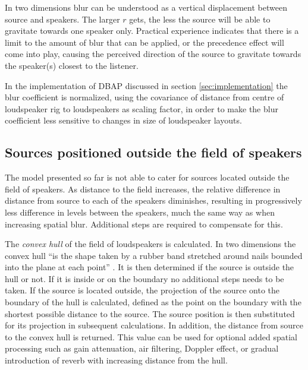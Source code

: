 \documentclass[twoside,10pt]{article}
\begin{document}
In two dimensions blur can be understood as a vertical displacement between source and speakers. The larger $r$ gets, the less the source will be able to gravitate towards one speaker only. Practical experience indicates that there is a limit to the amount of blur that can be applied, or the precedence effect \cite{Litovsky:1999precedence_effect} will come into play, causing the perceived direction of the source to gravitate towards the speaker(s) closest to the listener.

In the implementation of DBAP discussed in section \ref{sec:implementation} the blur coefficient is normalized, using the covariance of distance from centre of loudspeaker rig to loudspeakers as scaling factor, in order to make the blur coefficient less sensitive to changes in size of loudspeaker layouts.



\subsection{Sources positioned outside the field of speakers}

The model presented so far is not able to cater for sources located outside the field of speakers. As distance to the field increases, the relative difference in distance from source to each of the speakers diminishes, resulting in progressively less difference in levels between the speakers, much the same way as when increasing spatial blur. Additional steps are required to compensate for this.

The \emph{convex hull} of the field of loudspeakers is calculated. In two dimensions the convex hull ``is the shape taken by a rubber band stretched around nails bounded into the plane at each point'' \cite{Rourke:1998_geometry}. It is then determined if the source is outside the hull or not. If it is inside or on the boundary no additional steps needs to be taken. If the source is located outside, the projection of the source onto the boundary of the hull is calculated, defined as the point on the boundary with the shortest possible distance to the source. The source position is then substituted for its projection in subsequent calculations. In addition, the distance from source to the convex hull is returned. This value can be used for optional added spatial processing such as gain attenuation, air filtering, Doppler effect, or gradual introduction of reverb with increasing distance from the hull.
\end{document}
